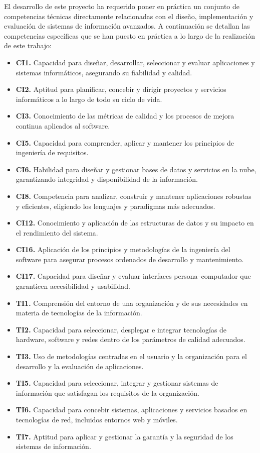 \begin{large}
El desarrollo de este proyecto ha requerido poner en práctica un conjunto de competencias técnicas directamente relacionadas con el diseño, implementación y evaluación de sistemas de información avanzados. A continuación se detallan las competencias específicas que se han puesto en práctica a lo largo de la realización de este trabajo:

\begin{itemize}[label=\raisebox{0.15ex}{\scriptsize$\blacksquare$}]
  \item \textbf{CI1.} Capacidad para diseñar, desarrollar, seleccionar y evaluar aplicaciones y sistemas informáticos, asegurando su fiabilidad y calidad.
  \item \textbf{CI2.} Aptitud para planificar, concebir y dirigir proyectos y servicios informáticos a lo largo de todo su ciclo de vida.
  \item \textbf{CI3.} Conocimiento de las métricas de calidad y los procesos de mejora continua aplicados al software.
  \item \textbf{CI5.} Capacidad para comprender, aplicar y mantener los principios de ingeniería de requisitos.
  \item \textbf{CI6.} Habilidad para diseñar y gestionar bases de datos y servicios en la nube, garantizando integridad y disponibilidad de la información.
  \item \textbf{CI8.} Competencia para analizar, construir y mantener aplicaciones robustas y eficientes, eligiendo los lenguajes y paradigmas más adecuados.
  \item \textbf{CI12.} Conocimiento y aplicación de las estructuras de datos y su impacto en el rendimiento del sistema.
  \item \textbf{CI16.} Aplicación de los principios y metodologías de la ingeniería del software para asegurar procesos ordenados de desarrollo y mantenimiento.
  \item \textbf{CI17.} Capacidad para diseñar y evaluar interfaces persona–computador que garanticen accesibilidad y usabilidad.
  \item \textbf{TI1.} Comprensión del entorno de una organización y de sus necesidades en materia de tecnologías de la información.
  \item \textbf{TI2.} Capacidad para seleccionar, desplegar e integrar tecnologías de hardware, software y redes dentro de los parámetros de calidad adecuados.
  \item \textbf{TI3.} Uso de metodologías centradas en el usuario y la organización para el desarrollo y la evaluación de aplicaciones.
  \item \textbf{TI5.} Capacidad para seleccionar, integrar y gestionar sistemas de información que satisfagan los requisitos de la organización.
  \item \textbf{TI6.} Capacidad para concebir sistemas, aplicaciones y servicios basados en tecnologías de red, incluidos entornos web y móviles.
  \item \textbf{TI7.} Aptitud para aplicar y gestionar la garantía y la seguridad de los sistemas de información.
\end{itemize}


\end{large}
